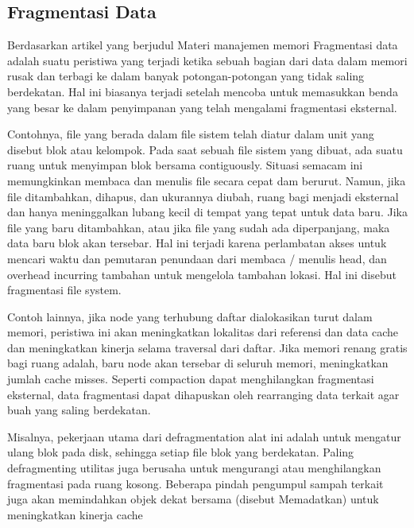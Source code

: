 \subsection{Fragmentasi Data}
Berdasarkan artikel yang berjudul Materi manajemen memori \cite{tawarmateri} Fragmentasi data adalah suatu peristiwa  yang terjadi ketika sebuah bagian dari data dalam memori rusak dan terbagi ke dalam banyak potongan-potongan yang tidak saling berdekatan. Hal ini biasanya terjadi setelah mencoba untuk memasukkan benda yang besar ke dalam penyimpanan yang telah mengalami fragmentasi eksternal.
    
Contohnya, file yang berada dalam file sistem telah diatur dalam unit yang disebut blok atau kelompok. Pada saat sebuah file sistem yang dibuat, ada suatu ruang untuk menyimpan blok bersama contiguously. Situasi semacam ini memungkinkan membaca dan menulis file secara cepat dam berurut. Namun, jika file ditambahkan, dihapus, dan ukurannya diubah, ruang bagi menjadi eksternal dan hanya meninggalkan lubang kecil di tempat yang tepat untuk data baru. Jika file yang baru ditambahkan, atau jika file yang sudah ada diperpanjang, maka data baru blok akan tersebar. Hal ini terjadi karena perlambatan akses untuk mencari waktu dan pemutaran penundaan dari membaca / menulis head, dan overhead incurring tambahan untuk mengelola tambahan lokasi. Hal ini disebut fragmentasi file system.

Contoh lainnya, jika node yang terhubung daftar dialokasikan turut dalam memori, peristiwa ini akan meningkatkan lokalitas dari referensi dan data cache dan meningkatkan kinerja selama traversal dari daftar. Jika memori renang gratis bagi ruang adalah, baru node akan tersebar di seluruh memori, meningkatkan jumlah cache misses.
Seperti compaction dapat menghilangkan fragmentasi eksternal, data fragmentasi dapat dihapuskan oleh rearranging data terkait agar buah yang saling berdekatan. 

Misalnya, pekerjaan utama dari defragmentation alat ini adalah untuk mengatur ulang blok pada disk, sehingga setiap file blok yang berdekatan. Paling defragmenting utilitas juga berusaha untuk mengurangi atau menghilangkan fragmentasi pada ruang kosong. Beberapa pindah pengumpul sampah terkait juga akan memindahkan objek dekat bersama (disebut Memadatkan) untuk meningkatkan kinerja cache
